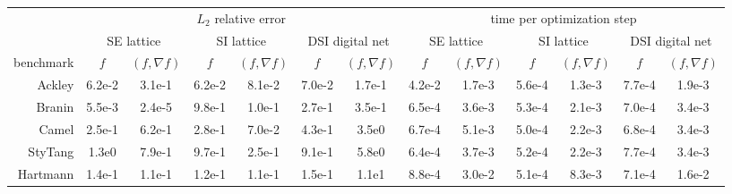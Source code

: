   \begin{tabular}{r|cccccc|cccccc}
    & \multicolumn{6}{c|}{$L_2$ relative error} & \multicolumn{6}{c}{time per optimization step} \\
    & \multicolumn{2}{c}{SE lattice} & \multicolumn{2}{c}{SI lattice} & \multicolumn{2}{c}{DSI digital net} & \multicolumn{2}{c}{SE lattice} & \multicolumn{2}{c}{SI lattice} & \multicolumn{2}{c}{DSI digital net} \\
    benchmark & $f$ & $(f, \nabla f)$ & $f$ & $(f, \nabla f)$ & $f$ & $(f, \nabla f)$ & $f$ & $(f, \nabla f)$ & $f$ & $(f, \nabla f)$ & $f$ & $(f, \nabla f)$ \\
    \hline
        Ackley & 6.2e-2 & 3.1e-1 & 6.2e-2 & 8.1e-2 & 7.0e-2 & 1.7e-1 & 4.2e-2 & 1.7e-3 & 5.6e-4 & 1.3e-3 & 7.7e-4 & 1.9e-3 \\
        Branin & 5.5e-3 & 2.4e-5 & 9.8e-1 & 1.0e-1 & 2.7e-1 & 3.5e-1 & 6.5e-4 & 3.6e-3 & 5.3e-4 & 2.1e-3 & 7.0e-4 & 3.4e-3 \\
        Camel & 2.5e-1 & 6.2e-1 & 2.8e-1 & 7.0e-2 & 4.3e-1 & 3.5e0 & 6.7e-4 & 5.1e-3 & 5.0e-4 & 2.2e-3 & 6.8e-4 & 3.4e-3 \\
        StyTang & 1.3e0 & 7.9e-1 & 9.7e-1 & 2.5e-1 & 9.1e-1 & 5.8e0 & 6.4e-4 & 3.7e-3 & 5.2e-4 & 2.2e-3 & 7.7e-4 & 3.4e-3 \\
        Hartmann & 1.4e-1 & 1.1e-1 & 1.2e-1 & 1.1e-1 & 1.5e-1 & 1.1e1 & 8.8e-4 & 3.0e-2 & 5.1e-4 & 8.3e-3 & 7.1e-4 & 1.6e-2 \\
  \end{tabular}